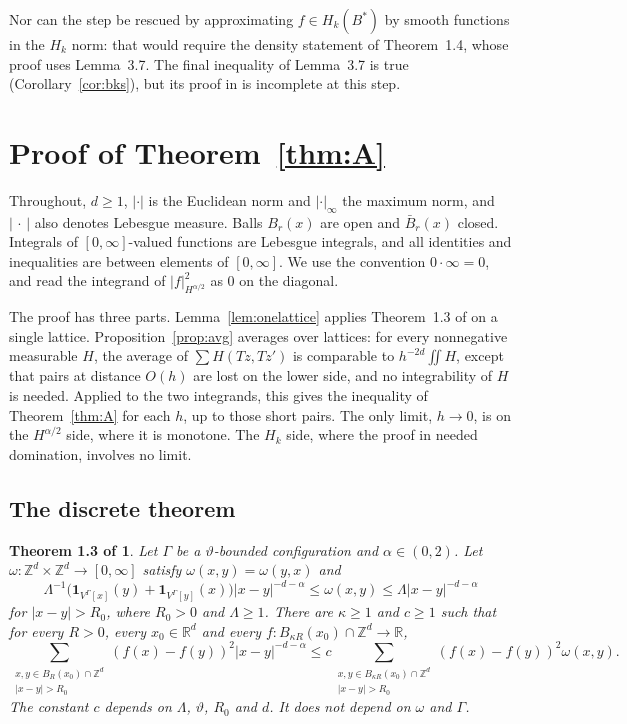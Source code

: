 \documentclass[11pt]{amsart}
\newtheorem*{bksthm}{Theorem 1.3 of \cite{BKS}}
\theoremstyle{remark}
\newcommand{\R}{\mathbb{R}}
\newcommand{\Z}{\mathbb{Z}}
\newcommand{\abs}[1]{\lvert #1\rvert}
\newcommand{\norm}[1]{\lvert #1\rvert}
\newcommand{\supn}[1]{\lvert #1\rvert_\infty}
\newcommand{\1}{\mathbf{1}}
\begin{document}
Nor can the step be rescued by approximating $f\in H_k(B^*)$ by smooth functions in the $H_k$
norm: that would require the density statement of Theorem~1.4, whose proof uses Lemma~3.7.
The final inequality of Lemma~3.7 is true (Corollary~\ref{cor:bks}), but its proof in \cite{BKS}
is incomplete at this step.

\section{Proof of Theorem~\ref{thm:A}}\label{sec:proof}

Throughout, $d\ge1$, $\norm{\cdot}$ is the Euclidean norm and $\supn{\cdot}$ the maximum norm, and
$\abs{\,\cdot\,}$ also denotes Lebesgue measure. Balls $B_r(x)$ are open and $\bar B_r(x)$
closed. Integrals of $[0,\infty]$-valued functions are Lebesgue integrals, and all identities
and inequalities are between elements of $[0,\infty]$. We use the convention $0\cdot\infty=0$, and read
the integrand of $\abs{f}^2_{H^{\alpha/2}}$ as $0$ on the diagonal.

The proof has three parts. Lemma~\ref{lem:onelattice} applies Theorem~1.3 of \cite{BKS} on a single
lattice. Proposition~\ref{prop:avg} averages over lattices: for every nonnegative measurable $H$,
the average of $\sum H(Tz,Tz')$ is comparable to $h^{-2d}\iint H$, except that pairs at distance
$O(h)$ are lost on the lower side, and no integrability of $H$ is needed. Applied to the two
integrands, this gives the inequality of Theorem~\ref{thm:A} for each $h$, up to those short
pairs. The only limit, $h\to0$, is on the $H^{\alpha/2}$ side, where it is monotone. The $H_k$ side,
where the proof in \cite{BKS} needed domination, involves no limit.

\subsection{The discrete theorem}\label{sec:discrete}

\begin{bksthm}
Let $\Gamma$ be a $\vartheta$-bounded configuration and $\alpha\in(0,2)$. Let
$\omega\colon\Z^d\times\Z^d\to[0,\infty]$ satisfy $\omega(x,y)=\omega(y,x)$ and
\[
  \Lambda^{-1}\bigl(\1_{V^\Gamma[x]}(y)+\1_{V^\Gamma[y]}(x)\bigr)\abs{x-y}^{-d-\alpha}
  \le\omega(x,y)\le\Lambda\abs{x-y}^{-d-\alpha}
\]
for $\abs{x-y}>R_0$, where $R_0>0$ and $\Lambda\ge1$. There are $\kappa\ge1$ and $c\ge1$ such that
for every $R>0$, every $x_0\in\R^d$ and every $f\colon B_{\kappa R}(x_0)\cap\Z^d\to\R$,
\[
  \sum_{\substack{x,y\in B_R(x_0)\cap\Z^d\\ \abs{x-y}>R_0}}(f(x)-f(y))^2\abs{x-y}^{-d-\alpha}
  \le c\sum_{\substack{x,y\in B_{\kappa R}(x_0)\cap\Z^d\\ \abs{x-y}>R_0}}(f(x)-f(y))^2\omega(x,y).
\]
The constant $c$ depends on $\Lambda$, $\vartheta$, $R_0$ and $d$. It does not depend on $\omega$
and $\Gamma$.
\end{bksthm}
\end{document}
